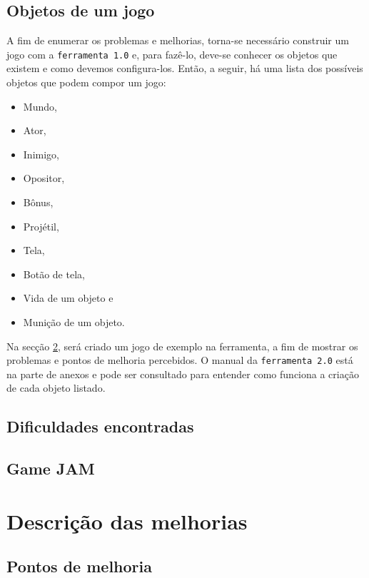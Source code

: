 \documentclass[12pt,twoside,openright,a4paper,english,brazil,sumario=tradicional]{abntex2}
\begin{document}
\section{Objetos de um jogo}
\label{sec:objetos}

A fim de enumerar os problemas e melhorias, torna-se necessário construir um jogo com a \texttt{ferramenta 1.0} e, para fazê-lo, deve-se conhecer os objetos que existem e como devemos configura-los. Então, a seguir, há uma lista dos possíveis objetos que podem compor um jogo:

\begin{itemize}
	\item Mundo,
	\item Ator,
	\item Inimigo,
	\item Opositor,
	\item Bônus,
	\item Projétil,
	\item Tela,
	\item Botão de tela,
	\item Vida de um objeto e
	\item Munição de um objeto.
\end{itemize}

Na secção \ref{sec:dificuldades}, será criado um jogo de exemplo na ferramenta, a fim de mostrar os problemas e pontos de melhoria percebidos. O manual da \texttt{ferramenta 2.0} está na parte de anexos e pode ser consultado para entender como funciona a criação de cada objeto listado.

\section{Dificuldades encontradas}
\label{sec:dificuldades}

\section{Game JAM} %

\chapter{Descrição das melhorias} %
\label{chap:melhorias}
\section{Pontos de melhoria}
\end{document}
